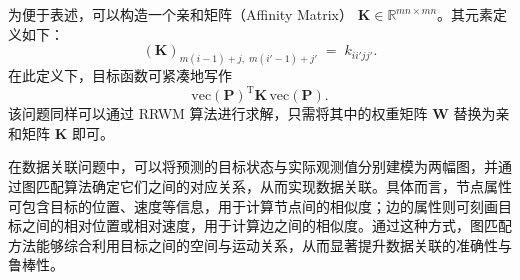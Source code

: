 为便于表述，可以构造一个亲和矩阵（Affinity Matrix） $\mathbf K \in \mathbb R^{mn \times mn}$。其元素定义如下：
\[
    (\mathbf K)_{m(i-1)+j,\;m(i'-1)+j'} \;=\; k_{ii'jj'}.
\]
在此定义下，目标函数可紧凑地写作
\[
    \mathrm{vec}(\mathbf P)^{\mathrm T} \mathbf K \, \mathrm{vec}(\mathbf P).
\]
该问题同样可以通过 RRWM 算法进行求解，只需将其中的权重矩阵 $\mathbf W$ 替换为亲和矩阵 $\mathbf K$ 即可。

在数据关联问题中，可以将预测的目标状态与实际观测值分别建模为两幅图，并通过图匹配算法确定它们之间的对应关系，从而实现数据关联。具体而言，节点属性可包含目标的位置、速度等信息，用于计算节点间的相似度；边的属性则可刻画目标之间的相对位置或相对速度，用于计算边之间的相似度。通过这种方式，图匹配方法能够综合利用目标之间的空间与运动关系，从而显著提升数据关联的准确性与鲁棒性。
